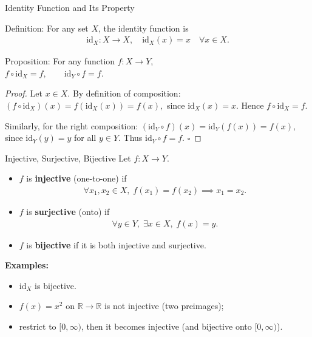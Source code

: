 \begin{frame}{Identity Function and Its Property}
\vspace{-0.4cm}
\begin{block}{Definition:} For any set \(X\), the identity function is
\begin{align*}
\mathrm{id}_X: X \to X, \quad \mathrm{id}_X(x) = x \quad \forall x \in X.    
\end{align*}
\end{block}

\vspace{-0.5cm}
\begin{block}{Proposition:}
For any function \( f: X \to Y \),\\ $f \circ \mathrm{id}_X = f, \qquad \mathrm{id}_Y \circ f = f.$
\end{block}
\vspace{-0.4cm}
\begin{proof}
Let \(x \in X\).  
By definition of composition: $
(f \circ \mathrm{id}_X)(x) = f(\mathrm{id}_X(x)) = f(x),$  since \(\mathrm{id}_X(x) = x\).  
Hence \(f \circ \mathrm{id}_X = f.\)

Similarly, for the right composition: $(\mathrm{id}_Y \circ f)(x) = \mathrm{id}_Y(f(x)) = f(x),$ since \(\mathrm{id}_Y(y) = y\) for all \(y \in Y\).  
Thus \(\mathrm{id}_Y \circ f = f.\) \(\square\)
\end{proof}
\end{frame}

\begin{frame}{Injective, Surjective, Bijective}
Let \(f: X \to Y\).

\begin{itemize}
  \item \(f\) is \textbf{injective} (one-to-one) if
  \begin{align*}
    \forall x_1, x_2 \in X,\; f(x_1) = f(x_2) \implies x_1 = x_2.
  \end{align*}
  \item \(f\) is \textbf{surjective} (onto) if
  \begin{align*}
    \forall y \in Y,\; \exists x \in X,\; f(x) = y.
  \end{align*}
  \item \(f\) is \textbf{bijective} if it is both injective and surjective.
\end{itemize}

\textbf{Examples:}  
\begin{itemize}
    \item \(\mathrm{id}_X\) is bijective.
    \item \(f(x) = x^2\) on \(\mathbb{R} \to \mathbb{R}\) is not injective (two preimages);
    \item restrict to \([0,\infty)\), then it becomes injective (and bijective onto \([0,\infty)\)).
\end{itemize}
\end{frame}

